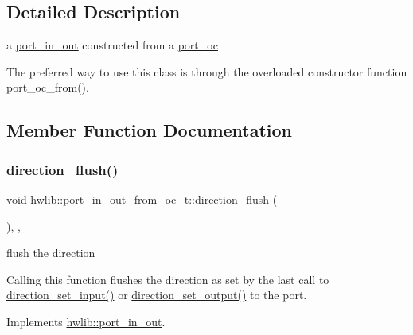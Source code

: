 \subsection{Detailed Description}
a \hyperlink{classhwlib_1_1port__in__out}{port\+\_\+in\+\_\+out} constructed from a \hyperlink{classhwlib_1_1port__oc}{port\+\_\+oc}

The preferred way to use this class is through the overloaded constructor function port\+\_\+oc\+\_\+from(). 

\subsection{Member Function Documentation}
\mbox{\label{classhwlib_1_1port__in__out__from__oc__t_aa8d8a3394669a8899d4e02f678722c3f}} 
\subsubsection{\texorpdfstring{direction\+\_\+flush()}{direction\_flush()}}
{\footnotesize\ttfamily void hwlib\+::port\+\_\+in\+\_\+out\+\_\+from\+\_\+oc\+\_\+t\+::direction\+\_\+flush (\begin{DoxyParamCaption}{ }\end{DoxyParamCaption})\hspace{0.3cm}{\ttfamily [inline]}, {\ttfamily [override]}, {\ttfamily [virtual]}}

flush the direction

Calling this function flushes the direction as set by the last call to \hyperlink{classhwlib_1_1port__in__out__from__oc__t_a701fe36cf6d03151ede1382c0ee054c5}{direction\+\_\+set\+\_\+input()} or \hyperlink{classhwlib_1_1port__in__out__from__oc__t_ab4cd56460a6627c3fc7f39cb2e78a9c8}{direction\+\_\+set\+\_\+output()} to the port. 

Implements \hyperlink{classhwlib_1_1port__in__out_a431b79eee48a21a93978bfdf6620f800}{hwlib\+::port\+\_\+in\+\_\+out}.

\mbox{\label{classhwlib_1_1port__in__out__from__oc__t_a701fe36cf6d03151ede1382c0ee054c5}} 
